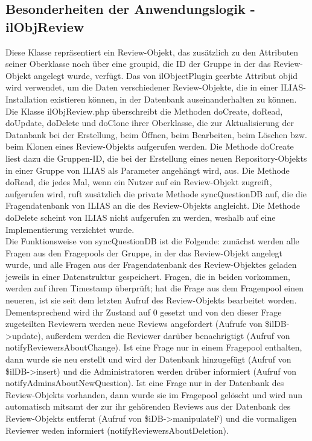 \documentclass[a4paper]{scrreprt}
\begin{document}
\subsection{Besonderheiten der Anwendungslogik - ilObjReview}
Diese Klasse repräsentiert ein Review-Objekt, das zusätzlich zu den Attributen seiner Oberklasse noch über eine group\textunderscore id, die ID der Gruppe in der das Review-Objekt angelegt wurde, verfügt. Das von ilObjectPlugin geerbte Attribut obj\textunderscore id wird verwendet, um die Daten verschiedener Review-Objekte, die in einer ILIAS-Installation existieren können, in der Datenbank auseinanderhalten zu können.\\
Die Klasse ilObjReview.php überschreibt die Methoden doCreate, doRead, doUpdate, doDelete und doClone ihrer Oberklasse, die zur Aktualisierung der Datanbank bei der Erstellung, beim Öffnen, beim Bearbeiten, beim Löschen bzw. beim Klonen eines Review-Objekts aufgerufen werden. Die Methode doCreate liest dazu die Gruppen-ID, die bei der Erstellung eines neuen Repository-Objekts in einer Gruppe von ILIAS als Parameter angehängt wird, aus. Die Methode doRead, die jedes Mal, wenn ein Nutzer auf ein Review-Objekt zugreift, aufgerufen wird, ruft zusätzlich die private Methode syncQuestionDB auf, die die Fragendatenbank von ILIAS an die des Review-Objekts angleicht. Die Methode doDelete scheint von ILIAS nicht aufgerufen zu werden, weshalb auf eine Implementierung verzichtet wurde.\\
Die Funktionsweise von syncQuestionDB ist die Folgende: zunächst werden alle Fragen aus den Fragepools der Gruppe, in der das Review-Objekt angelegt wurde, und alle Fragen aus der Fragendatenbank des Review-Objektes geladen jeweils in einer Datenstruktur gespeichert. Fragen, die in beiden vorkommen, werden auf ihren Timestamp überprüft; hat die Frage aus dem Fragenpool einen neueren, ist sie seit dem letzten Aufruf des Review-Objekts bearbeitet worden. Dementsprechend wird ihr Zustand auf 0 gesetzt und von den dieser Frage zugeteilten Reviewern werden neue Reviews angefordert (Aufrufe von \$ilDB->update), außerdem werden die Reviewer darüber benachrigtigt (Aufruf von notifyReviewersAboutChange). Ist eine Frage nur in einem Fragepool enthalten, dann wurde sie neu erstellt und wird der Datenbank hinzugefügt (Aufruf von \$ilDB->insert) und die Administratoren werden drüber informiert (Aufruf von notifyAdminsAboutNewQuestion). Ist eine Frage nur in der Datenbank des Review-Objekts vorhanden, dann wurde sie im Fragepool gelöscht und wird nun automatisch mitsamt der zur ihr gehörenden Reviews aus der Datenbank des Review-Objekts entfernt (Aufruf von \$iDB->manipulateF) und die vormaligen Reviewer weden informiert (notifyReviewersAboutDeletion).\\
\end{document}
